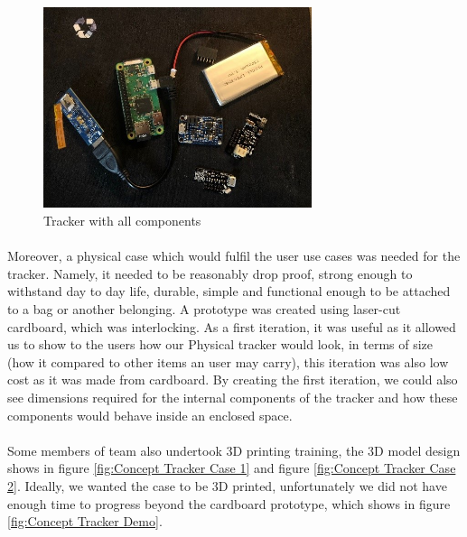 \documentclass[12pt,a4paper]{article}
\begin{document}
        \begin{figure}[H]
          \centering
          \includegraphics[width=0.7\textwidth]{../assets/design-tracker-with-all-components.jpg}
          \caption{Tracker with all components}
          \label{fig:Tracker with all components}
        \end{figure}
        
        \paragraph{} Moreover, a physical case which would fulfil the user use cases was needed for the tracker. Namely, it needed to be reasonably drop proof, strong enough to withstand day to day life, durable, simple and functional enough to be attached to a bag or another belonging. A prototype was created using laser-cut cardboard, which was interlocking. As a first iteration, it was useful as it allowed us to show to the users how our Physical tracker would look, in terms of size (how it compared to other items an user may carry), this iteration was also low cost as it was made from cardboard. By creating the first iteration, we could also see dimensions required for the internal components of the tracker and how these components would behave inside an enclosed space.
        
        \paragraph{} Some members of team also undertook 3D printing training, the 3D model design shows in figure \ref{fig:Concept Tracker Case 1} and figure \ref{fig:Concept Tracker Case 2}. Ideally, we wanted the case to be 3D printed, unfortunately we did not have enough time to progress beyond the cardboard prototype, which shows in figure \ref{fig:Concept Tracker Demo}.
        
\end{document}

